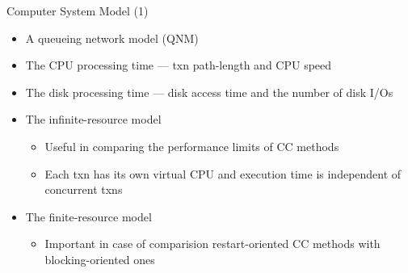\documentclass[sans]{beamer}
\begin{document}
\begin{frame}{Computer System Model (1)}
  \begin{itemize}
    \item A queueing network model (QNM)
    \item The CPU processing time --- txn path-length and CPU speed
    \item The disk processing time --- disk access time and the number of disk I/Os
    \item The infinite-resource model
    \begin{itemize}
      \item Useful in comparing the performance limits of CC methods
      \item Each txn has its own virtual CPU and execution time is independent of concurrent txns
    \end{itemize}
    \item The finite-resource model
    \begin{itemize}
      \item Important in case of comparision restart-oriented CC methods with blocking-oriented ones
    \end{itemize}
  \end{itemize}
\end{frame}
\end{document}
